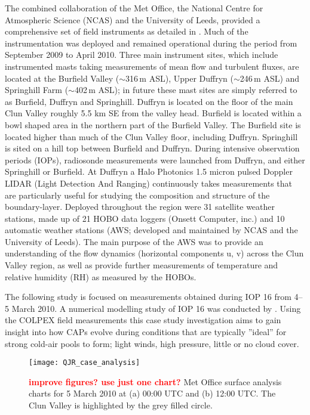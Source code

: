 \documentclass[times]{qjrms4}
\begin{document}
The combined collaboration of the Met Office, the National Centre for Atmospheric Science (NCAS) and the University of Leeds, provided a comprehensive set of field instruments as detailed in \citet{price2010COLPEX}. Much of the instrumentation was deployed and remained operational during the period from September 2009 to April 2010. Three main instrument sites, which include instrumented masts taking measurements of mean flow and turbulent fluxes, are located at the Burfield Valley ($\sim$316$\,\mbox{m}$ ASL), Upper Duffryn ($\sim$246$\,\mbox{m}$ ASL) and Springhill Farm ($\sim$402$\,\mbox{m}$ ASL); in future these mast sites are simply referred to as Burfield, Duffryn and Springhill. Duffryn is located on the floor of the main Clun Valley roughly 5.5 km SE from the valley head. Burfield is located within a bowl shaped area in the northern part of the Burfield Valley. The Burfield site is located higher than much of the Clun Valley floor, including Duffryn. Springhill is sited on a hill top between Burfield and Duffryn. During intensive observation periods (IOPs), radiosonde measurements were launched from Duffryn, and either Springhill or Burfield. At Duffryn a Halo Photonics 1.5 micron pulsed Doppler LIDAR (Light Detection And Ranging) continuously takes measurements that are particularly useful for studying the composition and structure of the boundary-layer. Deployed throughout the region were 31 satellite weather stations, made up of 21 HOBO data loggers (Onsett Computer, inc.) and 10 automatic weather stations (AWS; developed and maintained by NCAS and the University of Leeds). The main purpose of the AWS was to provide an understanding of the flow dynamics (horizontal components u, v) across the Clun Valley region, as well as provide further measurements of temperature and relative humidity (RH) as measured by the HOBOs.

The following study is focused on measurements obtained during IOP 16 from 4--5 March 2010. A numerical modelling study of IOP 16 was conducted by \citet{Vosper2013narrow}. Using the COLPEX field measurements this case study investigation aims to gain insight into how CAPs evolve during conditions that are typically ''ideal'' for strong cold-air pools to form; light winds, high pressure, little or no cloud cover.
        \begin{figure}
        \centering
        \texttt{[image: QJR\_case\_analysis]}
        \caption{\textcolor{red}{\bf improve figures? use just one chart?} Met Office surface analysis charts for 5 March 2010 at (a) 00:00 UTC and (b) 12:00 UTC. The Clun Valley is highlighted by the grey filled circle.}
        \label{fig:metcharts}
        \end{figure}
        
\end{document}
